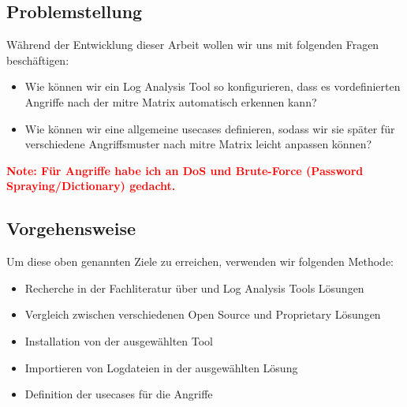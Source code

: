 \subsection{Problemstellung}
Während der Entwicklung dieser Arbeit wollen wir uns mit folgenden Fragen beschäftigen:

\begin{itemize}
   \item Wie können wir ein Log Analysis Tool so konfigurieren, dass es vordefinierten Angriffe nach der \gls{mitre} Matrix automatisch erkennen kann?
   \item Wie können wir eine allgemeine \gls{usecases} definieren, sodass wir sie später für verschiedene Angriffsmuster nach \gls{mitre} Matrix leicht anpassen können?
\end{itemize}

\textcolor{red}{\textbf{Note: Für Angriffe habe ich an DoS und Brute-Force (Password Spraying/Dictionary) gedacht.}}


\subsection{Vorgehensweise}
Um diese oben genannten Ziele zu erreichen, verwenden wir folgenden Methode:

\begin{itemize}[noitemsep]
   \item Recherche in der Fachliteratur über  und Log Analysis Tools Lösungen
   \item Vergleich zwischen verschiedenen \gls{Open Source} und \gls{Proprietary} Lösungen
   \item Installation von der ausgewählten Tool  
   \item Importieren von Logdateien in der ausgewählten Lösung
   \item Definition der \gls{usecases} für die Angriffe
\end{itemize}

